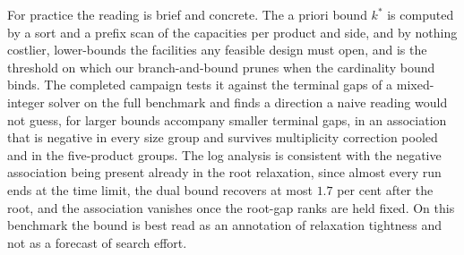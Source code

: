For practice the reading is brief and concrete. The a priori bound
$k^\ast$ is computed by a sort and a prefix scan of the capacities per
product and side, and by nothing costlier,
lower-bounds the
facilities any feasible design must open, and is the threshold on
which our branch-and-bound prunes when the cardinality bound binds. The completed campaign
tests it against the terminal gaps of a mixed-integer solver on the
full benchmark and finds a
direction a naive reading would not guess, for larger bounds accompany
smaller terminal gaps, in an association that is negative in every size
group and survives multiplicity correction pooled and in the
five-product groups. The log analysis is consistent with the
negative association being present already in the root relaxation,
since almost every run ends at the time limit, the dual bound recovers
at most $1.7$ per cent after the root, and the association vanishes
once the root-gap ranks are held fixed. On this
benchmark the bound is best read as an annotation of relaxation
tightness and not as a forecast of search effort.
